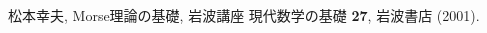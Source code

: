 \documentclass[11pt, a4paper, dvipdfmx]{jsarticle}
\theoremstyle{definition}
\theoremstyle{mystyle}
\numberwithin{equation}{section} %
\begin{document}



\begin{thebibliography}{15}

 松本幸夫, Morse理論の基礎, 岩波講座 現代数学の基礎 {\bf 27}, 岩波書店 (2001).

\end{thebibliography}
\end{document}
